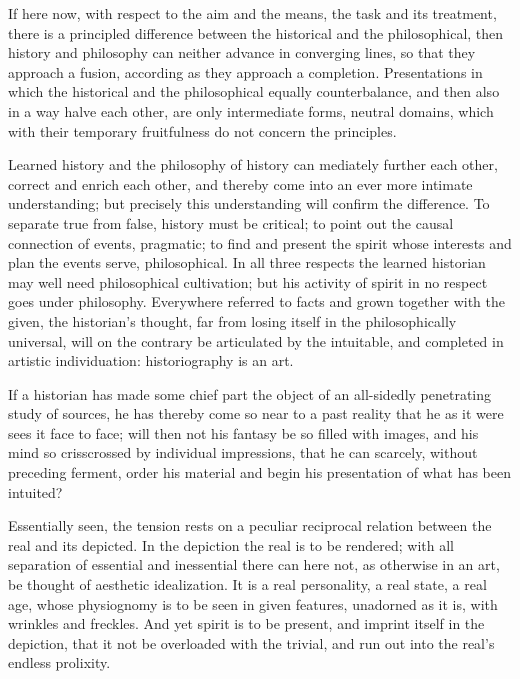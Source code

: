 \documentclass[12pt]{book}
\begin{document}
If here now, with respect to the aim and the means, the task and its treatment, there is a principled
difference between the historical and the philosophical, then history and philosophy can neither advance
in converging lines, so that they approach a fusion, according as they approach a completion. Presentations
in which the historical and the philosophical equally counterbalance, and then also in a way halve each
other, are only intermediate forms, neutral domains, which with their temporary fruitfulness do not concern
the principles.

Learned history and the philosophy of history can mediately further each other, correct and enrich each
other, and thereby come into an ever more intimate understanding; but precisely this understanding will
confirm the difference.
To separate true from false, history must be critical; to point out the causal connection of events,
pragmatic; to find and present the spirit whose interests and plan the events serve, philosophical. In all
three respects the learned historian may well need philosophical cultivation; but his activity of spirit
in no respect goes under philosophy. Everywhere referred to facts and grown together with the given, the
historian's thought, far from losing itself in the philosophically universal, will on the contrary be
articulated by the intuitable, and completed in artistic individuation: historiography is an art.

If a historian has made some chief part the object of an all-sidedly penetrating study of sources, he has
thereby come so near to a past reality that he as it were sees it face to face; will then not his fantasy
be so filled with images, and his mind so crisscrossed by individual impressions, that he can scarcely,
without preceding ferment, order his material and begin his presentation of what has been intuited?

Essentially seen, the tension rests on a peculiar reciprocal relation between the real and its depicted.
In the depiction the real is to be rendered; with all separation of essential and inessential there can
here not, as otherwise in an art, be thought of aesthetic idealization. It is a real personality, a real
state, a real age, whose physiognomy is to be seen in given features, unadorned as it is, with wrinkles and
freckles. And yet spirit is to be present, and imprint itself in the depiction, that it not be overloaded
with the trivial, and run out into the real's endless prolixity.
\end{document}
